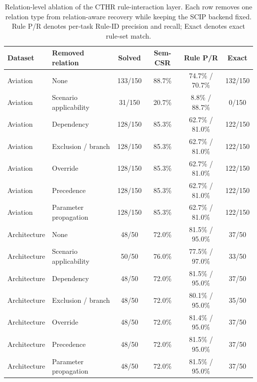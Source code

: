 ﻿\documentclass[a4paper,fleqn]{cas-dc}
\newcommand{\CTHR}{\textsc{CTHR}}
\begin{document}
\begin{table}[t]
\centering
\caption{Relation-level ablation of the \CTHR{} rule-interaction layer. Each row removes one relation type from relation-aware recovery while keeping the SCIP backend fixed. Rule P/R denotes per-task Rule-ID precision and recall; Exact denotes exact rule-set match.}
\label{tab:relation_ablation}
\scriptsize
\setlength{\tabcolsep}{3.5pt}
\begin{tabular*}{\textwidth}{@{}l@{\extracolsep{\fill}}lcccc@{}}
\toprule
Dataset & Removed relation & Solved & Sem-CSR & Rule P/R & Exact \\
\midrule
Aviation & None & 133/150 & 88.7\% & 74.7\% / 70.7\% & 132/150 \\
Aviation & Scenario applicability & 31/150 & 20.7\% & 8.8\% / 88.7\% & 0/150 \\
Aviation & Dependency & 128/150 & 85.3\% & 62.7\% / 81.0\% & 122/150 \\
Aviation & Exclusion / branch & 128/150 & 85.3\% & 62.7\% / 81.0\% & 122/150 \\
Aviation & Override & 128/150 & 85.3\% & 62.7\% / 81.0\% & 122/150 \\
Aviation & Precedence & 128/150 & 85.3\% & 62.7\% / 81.0\% & 122/150 \\
Aviation & Parameter propagation & 128/150 & 85.3\% & 62.7\% / 81.0\% & 122/150 \\
\midrule
Architecture & None & 48/50 & 72.0\% & 81.5\% / 95.0\% & 37/50 \\
Architecture & Scenario applicability & 50/50 & 76.0\% & 77.5\% / 97.0\% & 33/50 \\
Architecture & Dependency & 48/50 & 72.0\% & 81.5\% / 95.0\% & 37/50 \\
Architecture & Exclusion / branch & 48/50 & 72.0\% & 80.1\% / 95.0\% & 35/50 \\
Architecture & Override & 48/50 & 72.0\% & 81.4\% / 95.0\% & 37/50 \\
Architecture & Precedence & 48/50 & 72.0\% & 81.5\% / 95.0\% & 37/50 \\
Architecture & Parameter propagation & 48/50 & 72.0\% & 81.5\% / 95.0\% & 37/50 \\
\bottomrule
\end{tabular*}
\end{table}
\FloatBarrier
\end{document}
